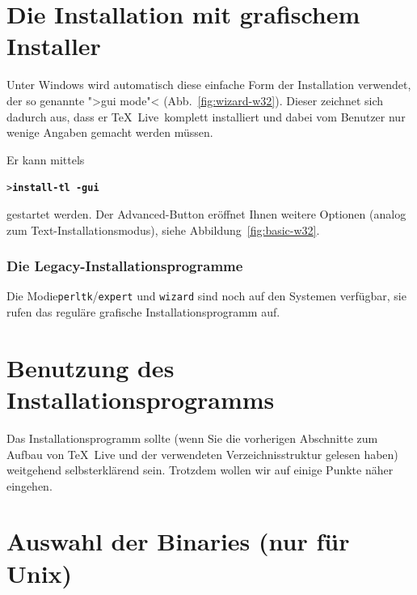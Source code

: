 \documentclass[12pt,ngerman,a4paper,fullparskip]{report}
\newcommand{\TL}{\TeX\ Live\xspace}
\newcommand{\Ucom}[1]{\textbf{\texttt{#1}}}
\begin{document}
\section{Die Installation mit grafischem Installer}

Unter Windows wird automatisch diese einfache Form der Installation verwendet,
der so genannte ">gui mode"< (Abb.~\ref{fig:wizard-w32}). Dieser zeichnet sich dadurch aus, dass er \TL\ komplett installiert und dabei vom Benutzer nur wenige Angaben gemacht werden müssen. 

Er kann mittels 

\begin{alltt}
> \Ucom{install-tl -gui}
\end{alltt}

gestartet werden.  Der Advanced-Button eröffnet Ihnen weitere Optionen (analog zum Text-Installationsmodus), siehe  Abbildung~\ref{fig:basic-w32}.

\subsubsection{Die Legacy-Installationsprogramme}

Die Modie\texttt{perltk}/\texttt{expert} und \texttt{wizard} sind noch auf den Systemen verfügbar, sie rufen das reguläre grafische Installationsprogramm auf.

\section{Benutzung des Installationsprogramms}\label{sec:runinstall}

Das Installationsprogramm sollte (wenn Sie die vorherigen Abschnitte zum Aufbau von \TL und der verwendeten Verzeichnisstruktur gelesen haben) weitgehend selbsterklärend sein. Trotzdem wollen wir auf einige Punkte näher eingehen.

\section{Auswahl der Binaries (nur für Unix)}\label{sec:binary}
\end{document}
